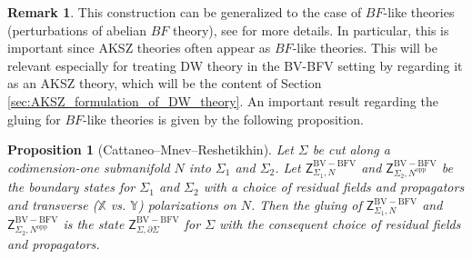 \documentclass[11pt,colorinlistoftodos]{amsart}
\numberwithin{equation}{subsection}
\theoremstyle{plain}
\newtheorem{prop}[thm]{Proposition}
\theoremstyle{definition}
\newtheorem{rem}[thm]{Remark}
\theoremstyle{remark}
\newcommand{\de}{\partial}
\begin{document}
\begin{rem}
This construction can be generalized to the case of $BF$-like theories (perturbations of abelian $BF$ theory), see \cite{CMR2} for more details. In particular, this is important since AKSZ theories often appear as $BF$-like theories.
This will be relevant especially for treating DW theory in the BV-BFV setting by regarding it as an AKSZ theory, which will be the content of Section \ref{sec:AKSZ_formulation_of_DW_theory}. An important result regarding the gluing for $BF$-like theories is given by the following proposition.
\begin{prop}[Cattaneo--Mnev--Reshetikhin\cite{CMR2}]
Let $\Sigma$ be cut along a codimension-one submanifold $N$ into $\Sigma_1$ and $\Sigma_2$. Let $\mathsf{Z}^{\scriptscriptstyle\mathrm{BV-BFV}}_{\Sigma_1,N}$ and $\mathsf{Z}^{\scriptscriptstyle\mathrm{BV-BFV}}_{\Sigma_2,N^\mathrm{opp}}$ be the boundary states for $\Sigma_1$ and $\Sigma_2$ with a choice of residual fields and propagators and transverse ($\mathds{X}$ vs. $\mathds{Y}$) polarizations on $N$. Then the gluing of $\mathsf{Z}^{\scriptscriptstyle\mathrm{BV-BFV}}_{\Sigma_1,N}$ and $\mathsf{Z}^{\scriptscriptstyle\mathrm{BV-BFV}}_{\Sigma_2,N^\mathrm{opp}}$ is the state $\mathsf{Z}^{\scriptscriptstyle\mathrm{BV-BFV}}_{\Sigma,\de\Sigma}$ for $\Sigma$ with the consequent choice of residual fields and propagators.
\end{prop}
\end{rem}
\end{document}
